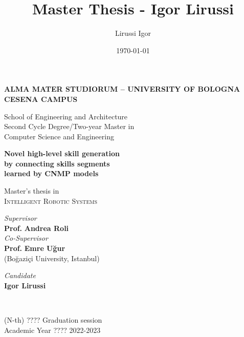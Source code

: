 \title{Master Thesis - Igor Lirussi}
\author{Lirussi Igor}
\date{\today}

\begin{titlepage}
	\begin{center}
		
		\large
		\textbf{ALMA MATER STUDIORUM -- UNIVERSITY OF BOLOGNA \\ CESENA CAMPUS }
		\\
		\noindent\hrulefill
		\vspace{0.4cm}
		
		\Large
		School of Engineering and Architecture \\
		Second Cycle Degree/Two-year Master in \\Computer Science and Engineering
		
		\Huge
		\vspace{4cm}
		\textbf{
			Novel high-level skill generation
			\\
			by connecting skills segments
			\\
			learned by CNMP models
		}
		
		\large
		\vspace{1cm}
		Master's thesis in 
		\\
		\textsc{Intelligent Robotic Systems}
		
		\vspace{5.5cm}
		\begin{minipage}[t]{0.64\textwidth}
			\begin{flushleft}
				\textit{Supervisor} 
				\\ 
				\textbf{Prof.} \textbf{Andrea Roli}
				\\
				\vspace{0.4cm}
				\textit{Co-Supervisor} 
				\\
				\textbf{Prof.} \textbf{Emre Uğur} \\(Boğaziçi University, Istanbul)
			\end{flushleft}
		\end{minipage}
		\begin{minipage}[t]{0.34\textwidth}
			\begin{flushright}
				\textit{Candidate} 
				\\ 
				\textbf{Igor Lirussi}
			\end{flushright}
		\end{minipage}\\
		
		\vfill
		\noindent\hrulefill
		\vspace{0.3cm}
		\Large
		
		(N-th) ???? Graduation session
		\\
		Academic Year ???? 2022-2023
	\end{center}
\end{titlepage}
\restoregeometry
